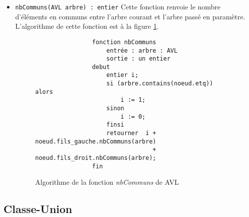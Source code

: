 \documentclass[a4paper]{article}
\begin{document}
\begin{itemize}
			\item \verb|nbCommuns(AVL arbre) : entier| Cette  fonction renvoie le nombre d'éléments en communs entre l'arbre courant et l'arbre passé en paramètre. L'algorithme de cette fonction est à la figure \ref{algo_nbCommuns}.
			
			\begin{figure}
	    	    \begin{verbatim}
	    	    fonction nbCommuns
	    	        entrée : arbre : AVL
	    	        sortie : un entier
	    	    debut
	    	        entier i;
	    	        si (arbre.contains(noeud.etq)) alors
	    	            i := 1;
	    	        sinon
	    	            i := 0;
	    	        finsi
	    	        retourner  i + noeud.fils_gauche.nbCommuns(arbre) 
	    	                     + noeud.fils_droit.nbCommuns(arbre);
	    	    fin
	    	    \end{verbatim}
	    	    \caption{Algorithme de la fonction \textit{nbCommuns} de AVL \label{algo_nbCommuns} }
	    	 \end{figure}
	    	 
		\end{itemize}
		
		\subsection{Classe-Union}
\end{document}
